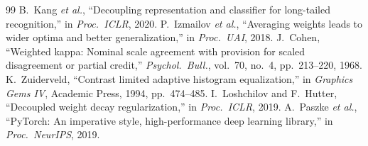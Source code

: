 \documentclass[10pt,twocolumn]{article}
\begin{document}
\begin{thebibliography}{99}
 B.~Kang \emph{et al.}, ``Decoupling representation and classifier for long-tailed recognition,'' in \emph{Proc.\ ICLR}, 2020.
 P.~Izmailov \emph{et al.}, ``Averaging weights leads to wider optima and better generalization,'' in \emph{Proc.\ UAI}, 2018.
 J.~Cohen, ``Weighted kappa: Nominal scale agreement with provision for scaled disagreement or partial credit,'' \emph{Psychol.\ Bull.}, vol.~70, no.~4, pp.~213--220, 1968.
 K.~Zuiderveld, ``Contrast limited adaptive histogram equalization,'' in \emph{Graphics Gems IV}, Academic Press, 1994, pp.~474--485.
 I.~Loshchilov and F.~Hutter, ``Decoupled weight decay regularization,'' in \emph{Proc.\ ICLR}, 2019.
 A.~Paszke \emph{et al.}, ``PyTorch: An imperative style, high-performance deep learning library,'' in \emph{Proc.\ NeurIPS}, 2019.
\end{thebibliography}
\endgroup
\end{document}
